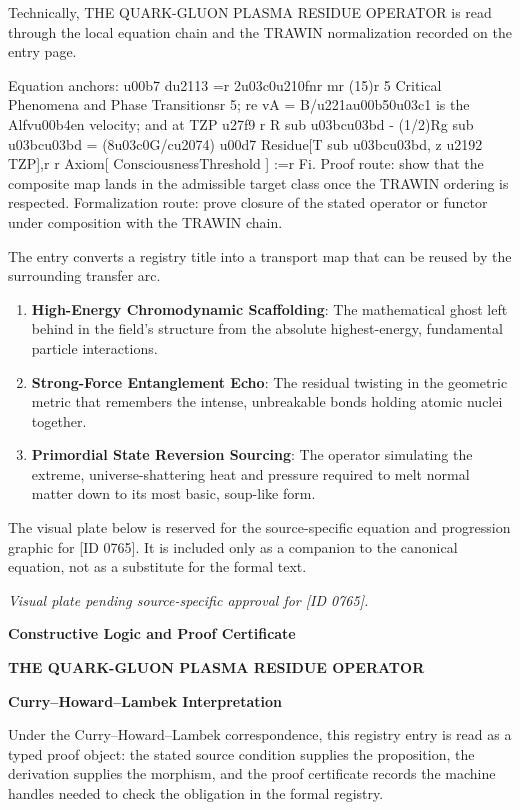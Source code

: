 Technically, THE QUARK-GLUON PLASMA RESIDUE OPERATOR is read through the local equation chain and the TRAWIN normalization recorded on the entry page.

Equation anchors: u00b7 du2113 =r 2u03c0u210fnr mr (15)r 5 Critical Phenomena and Phase Transitionsr 5; re vA = B/u221au00b50u03c1 is the Alfvu00b4en velocity; and at TZP u27f9 r R sub u03bcu03bd - (1/2)Rg sub u03bcu03bd = (8u03c0G/cu2074) u00d7 Residue[T sub u03bcu03bd, z u2192 TZP],r r Axiom[ ConsciousnessThreshold ] :=r Fi. Proof route: show that the composite map lands in the admissible target class once the TRAWIN ordering is respected. Formalization route: prove closure of the stated operator or functor under composition with the TRAWIN chain.

The entry converts a registry title into a transport map that can be reused by the surrounding transfer arc.
\endgroup

\begin{enumerate}[leftmargin=1.6em,itemsep=6pt,topsep=4pt]
\item \textbf{High-Energy Chromodynamic Scaffolding}: The mathematical ghost left behind in the field's structure from the absolute highest-energy, fundamental particle interactions.
\item \textbf{Strong-Force Entanglement Echo}: The residual twisting in the geometric metric that remembers the intense, unbreakable bonds holding atomic nuclei together.
\item \textbf{Primordial State Reversion Sourcing}: The operator simulating the extreme, universe-shattering heat and pressure required to melt normal matter down to its most basic, soup-like form.
\end{enumerate}

\begingroup\footnotesize\sloppy
The visual plate below is reserved for the source-specific equation and progression graphic for [ID 0765]. It is included only as a companion to the canonical equation, not as a substitute for the formal text.
\par\endgroup
\begingroup\footnotesize\itshape
Visual plate pending source-specific approval for [ID 0765].
\par\endgroup

\clearpage
\begingroup\tzpsupportsetup
\noindent\textbf{\fontsize{10.8pt}{12.8pt}\selectfont [ID 0765] Constructive Logic and Proof Certificate}\par
\noindent\textbf{\fontsize{10pt}{12pt}\selectfont THE QUARK-GLUON PLASMA RESIDUE OPERATOR}\par
\vspace{0.45em}
\begingroup
\footnotesize
\setlength{\parskip}{0.22em}
\setlength{\parindent}{0pt}
\noindent\textbf{Curry--Howard--Lambek Interpretation}\par
Under the Curry--Howard--Lambek correspondence, this registry entry is read as a typed proof
object: the stated source condition supplies the proposition, the derivation supplies the
morphism, and the proof certificate records the machine handles needed to check the obligation
in the formal registry.

